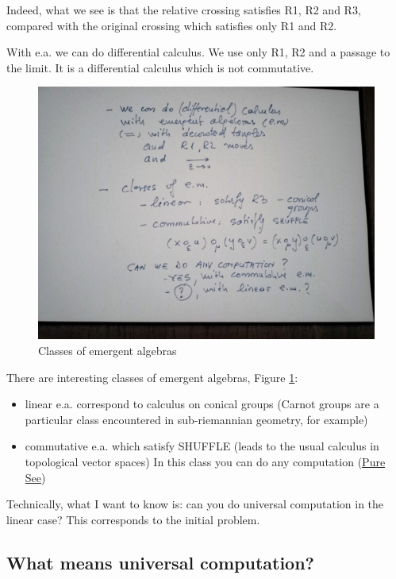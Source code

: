 \documentclass[]{article}
\begin{document}
Indeed, what we see is that the relative crossing satisfies R1, R2 and
R3, compared with the original crossing which satisfies only R1 and R2.

With e.a. we can do differential calculus. We use only R1, R2 and a
passage to the limit. It is a differential calculus which is not
commutative.

\begin{figure}[h!]
\centering
\includegraphics[width=0.75\linewidth]{img/2751.jpg}
\caption{Classes of emergent algebras}
\label{Classes-of-emergent-algebras}
\end{figure}

There are interesting classes of emergent algebras, Figure \ref{Classes-of-emergent-algebras}:

\begin{itemize}
\item
  linear e.a. correspond to calculus on conical groups (Carnot groups
  are a particular class encountered in sub-riemannian geometry, for
  example)
\item
  commutative e.a. which satisfy SHUFFLE (leads to the usual calculus in
  topological vector spaces) In this class you can do any computation
  (\href{https://mbuliga.github.io/quinegraphs/puresee.html}{Pure See})
\end{itemize}

Technically, what I want to know is: can you do universal computation in
the linear case? This corresponds to the initial problem.

\hypertarget{what-means-universal-computation}{%
\subsection{What means universal
computation?}\label{what-means-universal-computation}}
\end{document}
